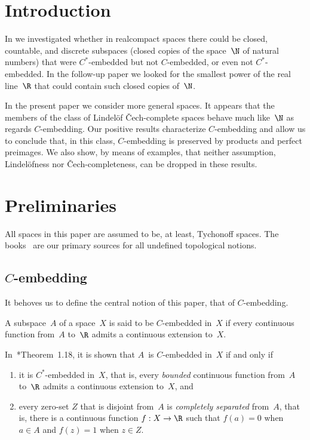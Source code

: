 \documentclass[a4paper]{amsart}
\theoremstyle{plain}
\theoremstyle{definition}
\theoremstyle{remark}
\begin{document}
\maketitle


\section*{Introduction}

In \cite{MR4634391}  we investigated whether
in realcompact spaces there could be closed, countable, and discrete
subspaces (closed copies of the space~$\N$ of natural numbers)
that were $C^*$-embedded but not $C$-embedded, or even 
not $C^*$-embedded.
In the fol\-low-up paper \cite{arxiv:2307.07223} we looked for the smallest
power of the real line~$\R$ that could contain such closed copies of~$\N$.

In the present paper we consider more general spaces.
It appears that the members of the class of Lindel\"of \v{C}ech-complete spaces
behave much like~$\N$ as regards $C$-embedding.
Our positive results characterize $C$-embedding and allow us to conclude
that, in this class, $C$-embedding is preserved by products and perfect 
preimages.
We also show, by means of examples, that neither assumption, Lindel\"ofness
nor \v{C}ech-completeness, can be dropped in these results.


\section{Preliminaries}
\label{sec.prelim}

All spaces in this paper are assumed to be, at least, Tychonoff spaces.
The books~\cites{MR0407579,MR1039321} are our primary sources for all 
undefined topological notions.

\subsection{$C$-embedding}
It behoves us to define the central notion of this paper, that of $C$-embedding.

A subspace~$A$ of a space~$X$ is said to be $C$-embedded in~$X$ if every
continuous function from~$A$ to~$\R$ admits a continuous extension to~$X$.

In~\cite{MR0407579}*{Theorem~1.18}, it is shown that $A$~is 
$C$-embedded in~$X$ if and only if
\begin{enumerate}
\item it is $C^*$-embedded in~$X$, that is, every \emph{bounded} continuous
      function from~$A$ to~$\R$ admits a continuous extension to~$X$, 
      \label{item.Cstar} and
\item every zero-set $Z$ that is disjoint from~$A$ is 
      \emph{completely separated}
      from~$A$, that is, there is a continuous function $f:X\to\R$
      such that $f(a)=0$ when $a\in A$ and $f(z)=1$ when $z\in Z$. 
      \label{item.compsep} 
\end{enumerate}
\end{document}
